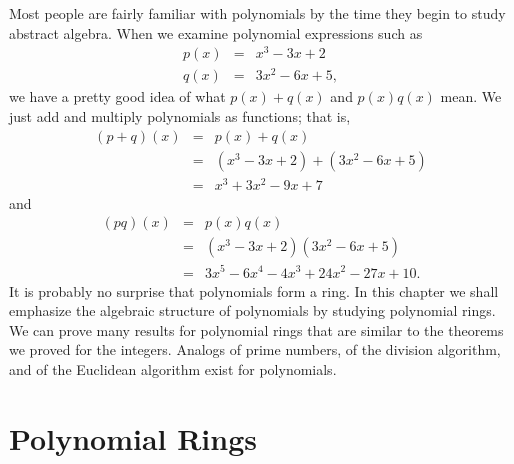 
Most people are fairly familiar with polynomials by the time they begin to study abstract algebra.  When we examine polynomial expressions such as 
\begin{eqnarray*} 
p(x) & = & x^3 -3x +2 \\
q(x) & = & 3x^2 -6x +5,
\end{eqnarray*}
we have a pretty good idea of what $p(x) + q(x)$ and $p(x) q(x)$ mean.  We just add and multiply polynomials as functions; that is, 
\begin{eqnarray*}
(p +q)(x) & = & p(x) + q(x) \\
& = &  ( x^3 - 3 x + 2 ) + ( 3 x^2 - 6 x + 5 ) \\
& = & x^3 + 3 x^2 - 9 x + 7
\end{eqnarray*}
and
\begin{eqnarray*}
(p q)(x) & = & p(x)  q(x) \\
& = &  ( x^3 - 3 x + 2 )  ( 3 x^2 - 6 x + 5 ) \\
& = & 3 x^5 - 6 x^4 - 4 x^3 + 24 x^2 - 27 x + 10.
\end{eqnarray*}
It is probably no surprise that polynomials form a ring.  In this chapter we shall emphasize the algebraic structure of polynomials by studying polynomial rings.  We can prove many results for polynomial rings that are similar to the theorems we proved for the integers.  Analogs of prime numbers, of the division algorithm, and of the Euclidean algorithm exist for polynomials.   

 
\section{Polynomial Rings}\label{poly_section_1}
 
